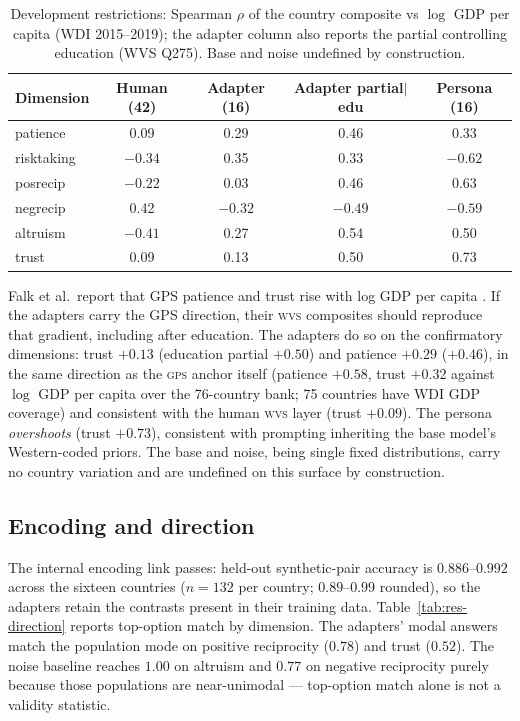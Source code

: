 \documentclass[10pt,letterpaper]{article}
\newcommand{\WVS}{\textsc{wvs}}
\newcommand{\GPS}{\textsc{gps}}
\begin{document}
\begin{table}[H]
\centering\small
\caption{Development restrictions: Spearman $\rho$ of the country composite vs $\log$ GDP per capita (WDI 2015--2019); the adapter column also reports the partial controlling education (WVS Q275). Base and noise undefined by construction.}\label{tab:res-dev}
\begin{tabular}{lcccc}
\toprule
Dimension & Human (42) & Adapter (16) & Adapter partial$|$edu & Persona (16)\\
\midrule
patience & 0.09 & 0.29 & 0.46 & 0.33\\
risktaking & $-0.34$ & 0.35 & 0.33 & $-0.62$\\
posrecip & $-0.22$ & 0.03 & 0.46 & 0.63\\
negrecip & 0.42 & $-0.32$ & $-0.49$ & $-0.59$\\
altruism & $-0.41$ & 0.27 & 0.54 & 0.50\\
trust & 0.09 & 0.13 & 0.50 & 0.73\\
\bottomrule
\end{tabular}
\end{table}

Falk et al.\ report that GPS patience and trust rise with log GDP per capita \cite{falk2018}. If the adapters carry the GPS direction, their \WVS{} composites should reproduce that gradient, including after education. The adapters do so on the confirmatory dimensions: trust $+0.13$ (education partial $+0.50$) and patience $+0.29$ ($+0.46$), in the same direction as the \GPS{} anchor itself (patience $+0.58$, trust $+0.32$ against $\log$ GDP per capita over the 76-country bank; 75 countries have WDI GDP coverage) and consistent with the human \WVS{} layer (trust $+0.09$). The persona \emph{overshoots} (trust $+0.73$), consistent with prompting inheriting the base model's Western-coded priors. The base and noise, being single fixed distributions, carry no country variation and are undefined on this surface by construction.

\subsection{Encoding and direction}
The internal encoding link passes: held-out synthetic-pair accuracy is $0.886$--$0.992$ across the sixteen countries ($n=132$ per country; $0.89$--$0.99$ rounded), so the adapters retain the contrasts present in their training data. Table~\ref{tab:res-direction} reports top-option match by dimension. The adapters' modal answers match the population mode on positive reciprocity ($0.78$) and trust ($0.52$). The noise baseline reaches $1.00$ on altruism and $0.77$ on negative reciprocity purely because those populations are near-unimodal --- top-option match alone is not a validity statistic.
\end{document}
